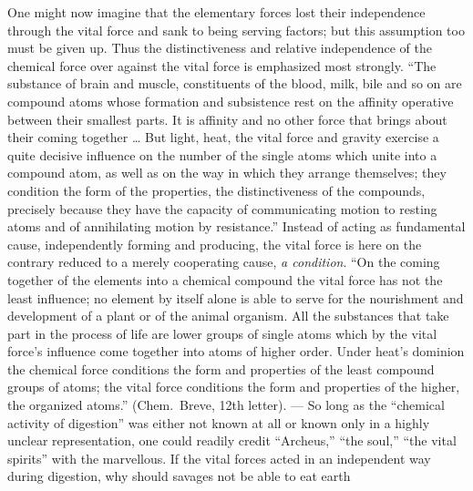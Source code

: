 \documentclass[12pt,a4paper]{book}
\begin{document}
One might now imagine that the elementary forces lost their independence
through the vital force and sank to being serving factors; but this assumption
too must be given up. Thus the distinctiveness and relative independence of the
chemical force over against the vital force is emphasized most strongly. ``The
substance of brain and muscle, constituents of the blood, milk, bile and so on
are compound atoms whose formation and subsistence rest
on the affinity operative between their smallest parts. It is affinity and no
other force that brings about their coming together \ldots{} But light, heat,
the vital force and gravity exercise a quite decisive influence on the number
of the single atoms which unite into a compound atom, as well as on the way in
which they arrange themselves; they condition the form of the properties, the
distinctiveness of the compounds, precisely because they have the capacity of
communicating motion to resting atoms and of annihilating motion by
resistance.'' Instead of acting as fundamental cause, independently forming and
producing, the vital force is here on the contrary reduced to a merely
cooperating cause, \emph{a condition}. ``On the coming together of the elements
into a chemical compound the vital force has not the least influence; no
element by itself alone is able to serve for the nourishment and development of
a plant or of the animal organism. All the substances that take part in the
process of life are lower groups of single atoms which by the vital force's
influence come together into atoms of higher order. Under heat's dominion the
chemical force conditions the form and properties of the least compound groups
of atoms; the vital force conditions the form and properties of the higher, the
organized atoms.'' (Chem.\ Breve, 12th letter). --- So long as the ``chemical
activity of digestion'' was either not known at all or known only in a highly
unclear representation, one could readily credit ``Archeus,'' ``the soul,''
``the vital spirits'' with the marvellous. If the vital forces acted in an
independent way during digestion, why should savages not be able to eat earth
\end{document}
